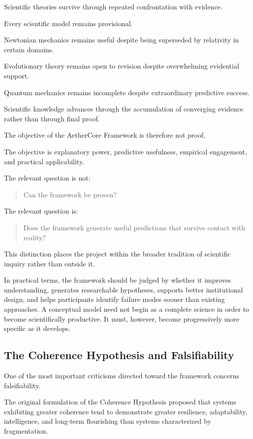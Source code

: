 \documentclass[12pt]{article}
\begin{document}
Scientific theories survive through repeated confrontation with evidence.

Every scientific model remains provisional.

Newtonian mechanics remains useful despite being superseded by relativity in certain domains.

Evolutionary theory remains open to revision despite overwhelming evidential support.

Quantum mechanics remains incomplete despite extraordinary predictive success.

Scientific knowledge advances through the accumulation of converging evidence rather than through final proof.

The objective of the AetherCore Framework is therefore not proof.

The objective is explanatory power, predictive usefulness, empirical engagement, and practical applicability.

The relevant question is not:

\begin{quote}
Can the framework be proven?
\end{quote}

The relevant question is:

\begin{quote}
Does the framework generate useful predictions that survive contact with reality?
\end{quote}

This distinction places the project within the broader tradition of scientific inquiry rather than outside it.

In practical terms, the framework should be judged by whether it improves understanding, generates researchable hypotheses, supports better institutional design, and helps participants identify failure modes sooner than existing approaches. A conceptual model need not begin as a complete science in order to become scientifically productive. It must, however, become progressively more specific as it develops.

\subsection{The Coherence Hypothesis and Falsifiability}

One of the most important criticisms directed toward the framework concerns falsifiability.

The original formulation of the Coherence Hypothesis proposed that systems exhibiting greater coherence tend to demonstrate greater resilience, adaptability, intelligence, and long-term flourishing than systems characterized by fragmentation.
\end{document}
